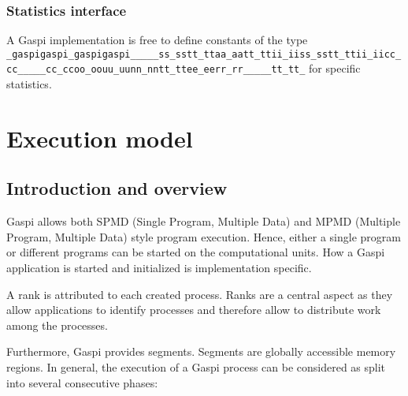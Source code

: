\documentclass[a4paper]{article}
\makeatletter
\newlength{\st}\setlength{\st}{0pt}
\newcommand{\zerowsep}{\hskip 0pt plus 0.1pt minus 0.1pt}
\newcommand{\ZSEP}[1]{\ifx#1\@@@EOZ@@@\let\next\relax\else\ifx#1\_#1\zerowsep\else#1\fi\let\next\ZSEP\fi\next}
\newcommand{\zsep}[1]{\ZSEP{}#1\@@@EOZ@@@}
\newcommand{\gaspiprefix}{gaspi}
\newcommand{\GASPI}{{\sc Gaspi}}
\newcommand{\type}[1]{{\tt #1}}
\newcommand{\gaspitype}[1]{\type{\protect\zsep{\gaspiprefix\_#1\_t}}}
\makeatother
\begin{document}
\subsubsection{Statistics interface}
A \GASPI{} implementation is free to define constants of the type \gaspitype{statistic\_counter} for specific statistics.

\section{Execution model}

\subsection{Introduction and overview}
\label{SubSec:ExecPhases}

\GASPI{} allows both SPMD (Single Program, Multiple Data) and MPMD
(Multiple Program, Multiple Data) style program execution.  Hence,
either a single program or different programs can be started on the
computational units. How a \GASPI{} application is started and
initialized is implementation specific.

A rank is attributed to each created process. Ranks are a
central aspect as they allow applications to identify processes and
therefore allow to distribute work among the processes.

Furthermore, \GASPI{} provides segments. Segments are 
globally accessible memory regions. In general,
the execution of a \GASPI{} process can be considered as split
into several consecutive phases:
\end{document}
